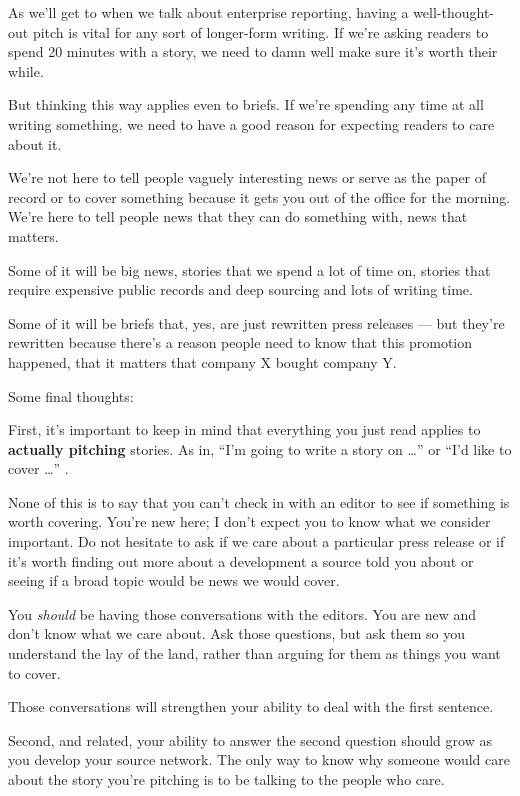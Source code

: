 \documentclass[
  11pt,
  american,
  letterpaperpaper,
  extrafontsizes,onecolumn,openright
  ]{memoir}
\begin{document}
As we'll get to when we talk about enterprise reporting, having a well-thought-out pitch is vital for any sort of longer-form writing. If we're asking readers to spend 20 minutes with a story, we need to damn well make sure it's worth their while.

But thinking this way applies even to briefs. If we're spending any time at all writing something, we need to have a good reason for expecting readers to care about it.

We're not here to tell people vaguely interesting news or serve as the paper of record or to cover something because it gets you out of the office for the morning. We're here to tell people news that they can do something with, news that matters.

Some of it will be big news, stories that we spend a lot of time on, stories that require expensive public records and deep sourcing and lots of writing time.

Some of it will be briefs that, yes, are just rewritten press releases --- but they're rewritten because there's a reason people need to know that this promotion happened, that it matters that company X bought company Y.

Some final thoughts:

First, it's important to keep in mind that everything you just read applies to \textbf{actually pitching} stories. As in, \enquote{I'm going to write a story on \ldots{}} or \enquote{I'd like to cover \ldots{}} .

None of this is to say that you can't check in with an editor to see if something is worth covering. You're new here; I don't expect you to know what we consider important. Do not hesitate to ask if we care about a particular press release or if it's worth finding out more about a development a source told you about or seeing if a broad topic would be news we would cover.

You \emph{should} be having those conversations with the editors. You are new and don't know what we care about.
Ask those questions, but ask them so you understand the lay of the land, rather than arguing for them as things you want to cover.

Those conversations will strengthen your ability to deal with the first sentence.

Second, and related, your ability to answer the second question should grow as you develop your source network. The only way to know why someone would care about the story you're pitching is to be talking to the people who care.
\end{document}
